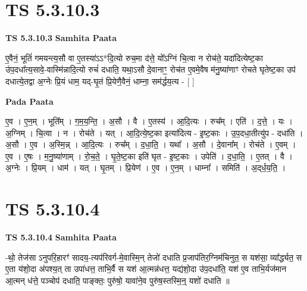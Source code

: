 \documentclass[17pt]{extarticle}
\begin{document}

\section{ TS 5.3.10.3 }

\textbf{TS 5.3.10.3 } \newline
\textbf{Samhita Paata} \newline

ए॒वैनं॒ भूतिं॑ गमयन्त्य॒सौ वा ए॒तस्या॑ऽऽ*दि॒त्यो रुच॒मा द॑त्ते॒ यो᳚ऽग्निं चि॒त्वा न रोच॑ते॒ यदा॑दित्येष्ट॒का उ॑प॒दधा᳚त्य॒सावे॒-वास्मि॑न्नादि॒त्यो रुचं॑ दधाति॒ यथा॒ऽसौ दे॒वानाꣳ॒॒ रोच॑त ए॒वमे॒वैष म॑नु॒ष्या॑णाꣳ रोचते घृतेष्ट॒का उप॑ दधात्ये॒तद्वा अ॒ग्नेः प्रि॒यं धाम॒ यद्-घृ॒तं प्रि॒येणै॒वैनं॒ धाम्ना॒ सम॑र्द्धय॒त्य - [  ] \newline

\textbf{Pada Paata} \newline

ए॒व । ए॒न॒म् । भूति᳚म् । ग॒म॒य॒न्ति॒ । अ॒सौ । वै । ए॒तस्य॑ । आ॒दि॒त्यः । रुच᳚म् । एति॑ । द॒त्ते॒ । यः । अ॒ग्निम् । चि॒त्वा । न । रोच॑ते । यत् । आ॒दि॒त्ये॒ष्ट॒का इत्या॑दित्य - इ॒ष्ट॒काः । उ॒प॒दधा॒तीत्यु॑प - दधा॑ति । अ॒सौ । ए॒व । अ॒स्मि॒न्न् । आ॒दि॒त्यः । रुच᳚म् । द॒धा॒ति॒ । यथा᳚ । अ॒सौ । दे॒वाना᳚म् । रोच॑ते । ए॒वम् । ए॒व । ए॒षः । म॒नु॒ष्या॑णाम् । रो॒च॒ते॒ । घृ॒ते॒ष्ट॒का इति॑ घृत - इ॒ष्ट॒काः । उपेति॑ । द॒धा॒ति॒ । ए॒तत् । वै । अ॒ग्नेः । प्रि॒यम् । धाम॑ । यत् । घृ॒तम् । प्रि॒येण॑ । ए॒व । ए॒न॒म् । धाम्ना᳚ । समिति॑ । अ॒द्‌र्ध॒य॒ति॒ ।  \newline





\section{ TS 5.3.10.4 }

\textbf{TS 5.3.10.4 } \newline
\textbf{Samhita Paata} \newline

-थो॒ तेज॑सा ऽनुपरि॒हारꣳ॑ सादय॒-त्यप॑रिवर्ग-मे॒वास्मि॒न् तेजो॑ दधाति प्र॒जाप॑तिर॒ग्निम॑चिनुत॒ स यश॑सा॒ व्या᳚र्द्ध्यत॒ स ए॒ता य॑शो॒दा अ॑पश्य॒त् ता उपा॑धत्त॒ ताभि॒र्वै स यश॑ आ॒त्मन्न॑धत्त॒ यद्य॑शो॒दा उ॑प॒दधा॑ति॒ यश॑ ए॒व ताभि॒र्यज॑मान आ॒त्मन् ध॑त्ते॒ पञ्चोप॑ दधाति॒ पाङ्क्तः॒ पुरु॑षो॒ यावा॑ने॒व पुरु॑ष॒स्तस्मि॒न्॒ यशो॑ दधाति ॥ \newline
\end{document}
